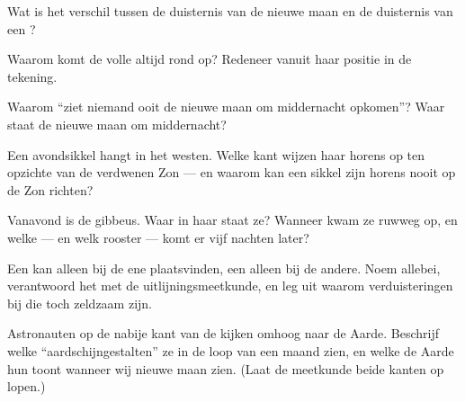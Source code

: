 \begin{exercise}[$\star$]\label{exo:g7:moon-phases:5}
Wat is het verschil tussen de duisternis van de nieuwe maan en de
duisternis van een ?
\end{exercise}

\begin{exercise}[$\star$]\label{exo:g7:moon-phases:6}
Waarom komt de volle  altijd rond  op? Redeneer
vanuit haar positie in de tekening.
\end{exercise}

\begin{exercise}[$\star$]\label{exo:g7:moon-phases:7}
Waarom ``ziet niemand ooit de nieuwe maan om middernacht opkomen''?
Waar staat de nieuwe maan om middernacht?
\end{exercise}

\begin{exercise}[$\star$]\label{exo:g7:moon-phases:8}
Een avondsikkel hangt in het westen. Welke kant wijzen haar horens
op ten opzichte van de verdwenen Zon --- en waarom kan een
sikkel zijn horens nooit op de Zon richten?
\end{exercise}

\begin{exercise}[$\star\star$]\label{exo:g7:moon-phases:9}
Vanavond is de   gibbeus. Waar in haar
 staat ze? Wanneer kwam ze ruwweg op, en welke
 --- en welk rooster --- komt er vijf nachten later?
\end{exercise}

\begin{exercise}[$\star\star$]\label{exo:g7:moon-phases:10}
Een  kan alleen bij de ene
 plaatsvinden, een  alleen bij de
andere. Noem allebei, verantwoord het met de uitlijningsmeetkunde, en
leg uit waarom verduisteringen bij die  toch zeldzaam
zijn.
\end{exercise}

\begin{exercise}[$\star\star$]\label{exo:g7:moon-phases:11}
Astronauten op de nabije kant van de  kijken omhoog naar de
Aarde. Beschrijf welke ``aardschijngestalten'' ze in de loop van een
maand zien, en welke  de Aarde hun toont wanneer wij
nieuwe maan zien. (Laat de meetkunde beide kanten op lopen.)
\end{exercise}

